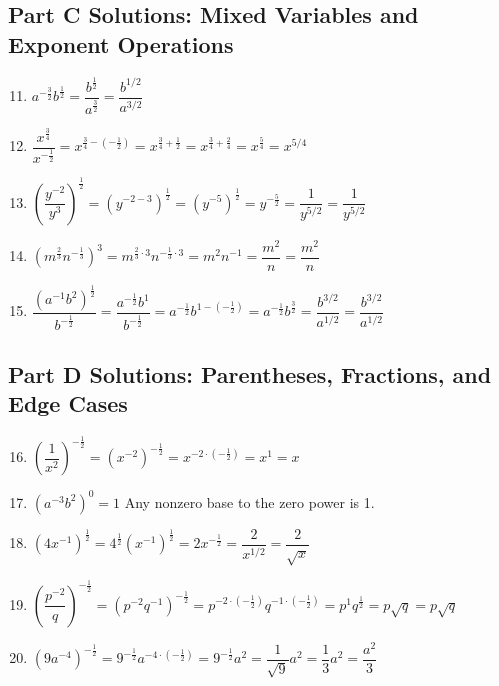 \documentclass[12pt]{article}
\begin{document}
\subsection*{Part C Solutions: Mixed Variables and Exponent Operations}
\begin{enumerate}
  \setcounter{enumi}{10}
  \item \(a^{-\frac{3}{2}} b^{\frac{1}{2}}
  = \dfrac{b^{\frac{1}{2}}}{a^{\frac{3}{2}}}
  = \boxed{\dfrac{b^{1/2}}{a^{3/2}}}\)

  \item \(\dfrac{x^{\frac{3}{4}}}{x^{-\frac{1}{2}}}
  = x^{\frac{3}{4} - \left(-\frac{1}{2}\right)}
  = x^{\frac{3}{4} + \frac{1}{2}}
  = x^{\frac{3}{4} + \frac{2}{4}}
  = x^{\frac{5}{4}}
  = \boxed{x^{5/4}}\)

  \item \(\left(\dfrac{y^{-2}}{y^3}\right)^{\frac{1}{2}}
  = \left(y^{-2-3}\right)^{\frac{1}{2}}
  = (y^{-5})^{\frac{1}{2}}
  = y^{-\frac{5}{2}}
  = \dfrac{1}{y^{5/2}}
  = \boxed{\dfrac{1}{y^{5/2}}}\)

  \item \((m^{\frac{2}{3}} n^{-\frac{1}{3}})^3
  = m^{\frac{2}{3} \cdot 3} n^{-\frac{1}{3} \cdot 3}
  = m^{2} n^{-1}
  = \dfrac{m^2}{n}
  = \boxed{\dfrac{m^2}{n}}\)

  \item \(\dfrac{(a^{-1} b^{2})^{\frac{1}{2}}}{b^{-\frac{1}{2}}}
  = \dfrac{a^{-\frac{1}{2}} b^{1}}{b^{-\frac{1}{2}}}
  = a^{-\frac{1}{2}} b^{1 - \left(-\frac{1}{2}\right)}
  = a^{-\frac{1}{2}} b^{\frac{3}{2}}
  = \dfrac{b^{3/2}}{a^{1/2}}
  = \boxed{\dfrac{b^{3/2}}{a^{1/2}}}\)
\end{enumerate}

\subsection*{Part D Solutions: Parentheses, Fractions, and Edge Cases}
\begin{enumerate}
  \setcounter{enumi}{15}
  \item \(\left(\dfrac{1}{x^2}\right)^{-\frac{1}{2}}
  = (x^{-2})^{-\frac{1}{2}}
  = x^{-2 \cdot \left(-\frac{1}{2}\right)}
  = x^{1}
  = \boxed{x}\)

  \item \((a^{-3} b^2)^0 = \boxed{1}\)  
  Any nonzero base to the zero power is 1.

  \item \((4x^{-1})^{\frac{1}{2}}
  = 4^{\frac{1}{2}} (x^{-1})^{\frac{1}{2}}
  = 2 x^{-\frac{1}{2}}
  = \dfrac{2}{x^{1/2}}
  = \boxed{\dfrac{2}{\sqrt{x}}}\)

  \item \(\left(\dfrac{p^{-2}}{q}\right)^{-\frac{1}{2}}
  = (p^{-2} q^{-1})^{-\frac{1}{2}}
  = p^{-2 \cdot \left(-\frac{1}{2}\right)} q^{-1 \cdot \left(-\frac{1}{2}\right)}
  = p^{1} q^{\frac{1}{2}}
  = p \sqrt{q}
  = \boxed{p\sqrt{q}}\)

  \item \((9a^{-4})^{-\frac{1}{2}}
  = 9^{-\frac{1}{2}} a^{-4 \cdot \left(-\frac{1}{2}\right)}
  = 9^{-\frac{1}{2}} a^{2}
  = \dfrac{1}{\sqrt{9}} a^{2}
  = \dfrac{1}{3} a^{2}
  = \boxed{\dfrac{a^2}{3}}\)
\end{enumerate}
\end{document}
